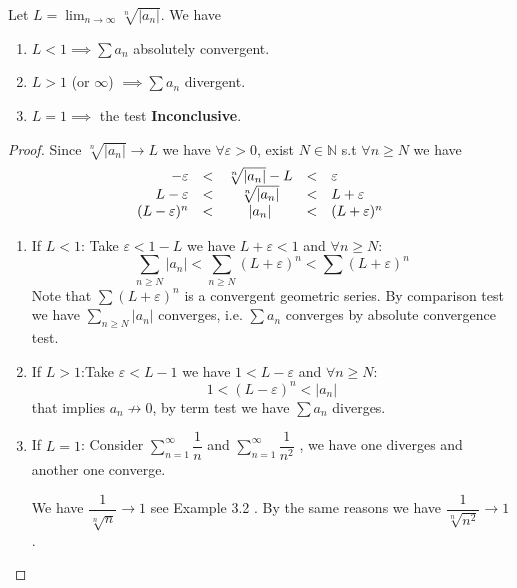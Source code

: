 \documentclass[
	UTF-8,
	11pt, %
	a4paper, %
]{LegrandOrangeBook}
\begin{document}
    \newpage

    \begin{theorem}
        Let $L = \lim_{n \to \infty} \sqrt[n]{|a_n|}$. We have
        \begin{enumerate}
            \item $L < 1 \implies \sum a_n $  absolutely convergent.
            \item $L > 1$ (or $\infty$) $\implies \sum a_n$ divergent.
            \item $L = 1 \implies$ the test \textbf{Inconclusive}.
        \end{enumerate}
    \end{theorem}

    \begin{proof}
        Since $ \sqrt[n]{|a_n|} \to L$ we have $\forall \varepsilon >0$, exist $N \in \mathbb{N}$ 
        s.t $\forall  n \geq N$ we have$$
        \begin{array}{r c c c l}
            -\varepsilon &<& \sqrt[n]{|a_n|}  - L &<& \varepsilon \\
                    L-\varepsilon &<& \sqrt[n]{|a_n|} &<& L + \varepsilon \\
                    (L-\varepsilon)^{n} &<& |a_n| &<& (L + \varepsilon)^{n} 
        \end{array}$$
        \begin{enumerate}
            \item If $L < 1$: Take $\varepsilon < 1-L$ 
            we have $L + \varepsilon < 1$ and $\forall n \geq N$:
            $$\sum_{n\geq N} |a_{n}| < \sum_{n\geq N} (L + \varepsilon)^n < \sum (L + \varepsilon)^n $$
            Note that $\sum (L + \varepsilon)^n$ is a convergent geometric series. 
            By comparison test we have $\sum _{n\geq N}|a_{n}|$ converges, i.e. $\sum a_{n}$ 
            converges by absolute convergence test. 

            \item If $L > 1$:Take $\varepsilon < L - 1$ we have $1 < L - \varepsilon$ and $\forall n \geq N$:
            $$ 1 < (L - \varepsilon)^{n} < |a_{n}| $$
            that implies $a_n \nrightarrow 0$, by term test we have $\sum a_n$ diverges.

            \item If $L = 1$: Consider $\sum_{n=1}^{\infty} \dfrac{1}{n}$ and $\sum_{n=1}^{\infty} \dfrac{1}{n^2}$
            , we have one diverges and another one converge.

            \begin{remark}
                We have $\dfrac{1}{\sqrt[n]{n}} \to 1$ see Example 3.2 .
                By the same reasons we have $\dfrac{1}{\sqrt[n]{n^2}} \to 1$.
            \end{remark}


\end{enumerate}
\end{proof}
\end{document}

